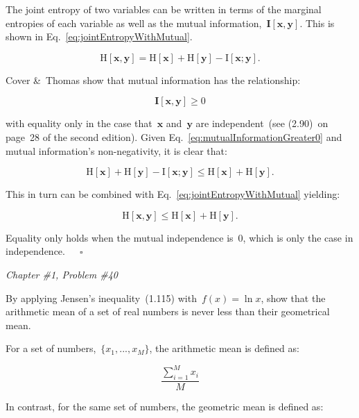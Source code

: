 \documentclass{report}
\newenvironment{problem}[2]
  {%
    \par%
    \medskip
    \leftskip=0pt\rightskip=0pt%
    \noindent \textit{Chapter \##1, Problem \##2} \\
    \bfseries  
  }
  {
    \par\medskip
  }
\begin{document}
  The joint entropy of two variables can be written in terms of the marginal entropies of each variable as well as the mutual information,~$\mathbf{I}[\mathbf{x},\mathbf{y}]$.  This is shown in Eq.~\eqref{eq:jointEntropyWithMutual}.
  
  \begin{equation}
    \textrm{H}[\mathbf{x},\mathbf{y}] = \textrm{H}[\mathbf{x}] + \textrm{H}[\mathbf{y}] - \textrm{I}[\mathbf{x};\mathbf{y}] \textrm{.}
    \label{eq:jointEntropyWithMutual}
  \end{equation}
  
  Cover \&~Thomas show that mutual information has the relationship:
  
  \begin{equation}
    \mathbf{I}[\mathbf{x},\mathbf{y}] \geq 0
    \label{eq:mutualInformationGreater0}
  \end{equation}
  
  \noindent
  with equality only in the case that~$\mathbf{x}$ and~$\mathbf{y}$ are independent~(see (2.90)~on page~28 of the second edition).  Given Eq.~\eqref{eq:mutualInformationGreater0} and mutual information's non-negativity, it is clear that:
  
  \[ \textrm{H}[\mathbf{x}] + \textrm{H}[\mathbf{y}] - \textrm{I}[\mathbf{x};\mathbf{y}] \leq \textrm{H}[\mathbf{x}] + \textrm{H}[\mathbf{y}] \textrm{.} \]
  
  This in turn can be combined with Eq.~\eqref{eq:jointEntropyWithMutual} yielding:
  
  \begin{equation}
    \textrm{H}[\mathbf{x},\mathbf{y}] \leq \textrm{H}[\mathbf{x}] + \textrm{H}[\mathbf{y}] \textrm{.}
  \end{equation}
  
  Equality only holds when the mutual independence is~$0$, which is only the case in independence.~~~$\square$
  
  \newpage
  \begin{problem}{1}{40}
     By applying Jensen's inequality~(1.115) with~$f(x)=\ln x$, show that the arithmetic mean of a set of real numbers is never less than their geometrical mean.
  \end{problem}
  
  For a set of numbers,~$\{x_1,...,x_M\}$, the arithmetic mean is defined as:
  
  \[ \frac{\sum_{i=1}^{M}x_i}{M} \]
  
  In contrast, for the same set of numbers, the geometric mean is defined as:
  
\end{document}
